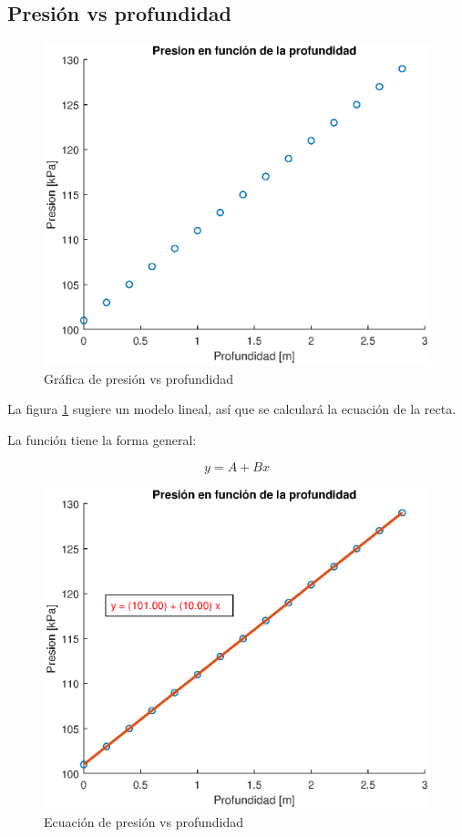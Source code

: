 \documentclass[letter,11pt]{article}
\begin{document}
\subsection{Presión vs profundidad}
\begin{figure}[!h]
\centering
\includegraphics[scale=1.00]{eps/practica32.eps}
\caption{Gráfica de presión vs profundidad}
\label{practica32}
\end{figure}

La figura \ref{practica32} sugiere un modelo lineal, así que se calculará la
ecuación de la recta.

La función tiene la forma general:

\begin{equation}
    y = A + B x
\end{equation}

\begin{figure}[!h]
\centering
\includegraphics[scale=1.00]{eps/practica32_2.eps}
\caption{Ecuación de presión vs profundidad}
\label{practica32_2}
\end{figure}
\end{document}
